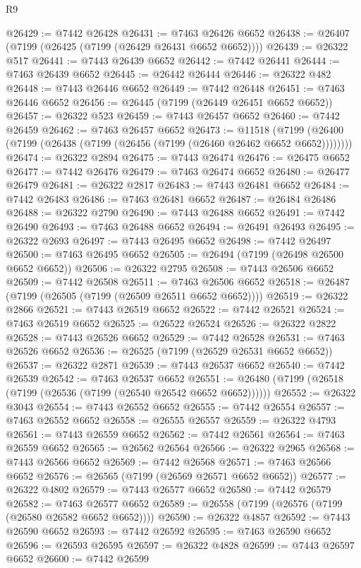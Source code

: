\begin{lexlean}{R9}
\begin{coremodule}
@26429 := @7442 @26428
@26431 := @7463 @26426 @6652
@26438 := @26407 (@7199 (@26425 (@7199 (@26429 @26431 @6652 @6652))))
@26439 := @26322 @517
@26441 := @7443 @26439 @6652
@26442 := @7442 @26441
@26444 := @7463 @26439 @6652
@26445 := @26442 @26444
@26446 := @26322 @482
@26448 := @7443 @26446 @6652
@26449 := @7442 @26448
@26451 := @7463 @26446 @6652
@26456 := @26445 (@7199 (@26449 @26451 @6652 @6652))
@26457 := @26322 @523
@26459 := @7443 @26457 @6652
@26460 := @7442 @26459
@26462 := @7463 @26457 @6652
@26473 := @11518
    (@7199 (@26400 (@7199 (@26438 (@7199 (@26456 (@7199 (@26460 @26462 @6652 @6652))))))))
@26474 := @26322 @2894
@26475 := @7443 @26474
@26476 := @26475 @6652
@26477 := @7442 @26476
@26479 := @7463 @26474 @6652
@26480 := @26477 @26479
@26481 := @26322 @2817
@26483 := @7443 @26481 @6652
@26484 := @7442 @26483
@26486 := @7463 @26481 @6652
@26487 := @26484 @26486
@26488 := @26322 @2790
@26490 := @7443 @26488 @6652
@26491 := @7442 @26490
@26493 := @7463 @26488 @6652
@26494 := @26491 @26493
@26495 := @26322 @2693
@26497 := @7443 @26495 @6652
@26498 := @7442 @26497
@26500 := @7463 @26495 @6652
@26505 := @26494 (@7199 (@26498 @26500 @6652 @6652))
@26506 := @26322 @2795
@26508 := @7443 @26506 @6652
@26509 := @7442 @26508
@26511 := @7463 @26506 @6652
@26518 := @26487 (@7199 (@26505 (@7199 (@26509 @26511 @6652 @6652))))
@26519 := @26322 @2866
@26521 := @7443 @26519 @6652
@26522 := @7442 @26521
@26524 := @7463 @26519 @6652
@26525 := @26522 @26524
@26526 := @26322 @2822
@26528 := @7443 @26526 @6652
@26529 := @7442 @26528
@26531 := @7463 @26526 @6652
@26536 := @26525 (@7199 (@26529 @26531 @6652 @6652))
@26537 := @26322 @2871
@26539 := @7443 @26537 @6652
@26540 := @7442 @26539
@26542 := @7463 @26537 @6652
@26551 := @26480 (@7199 (@26518 (@7199 (@26536 (@7199 (@26540 @26542 @6652 @6652))))))
@26552 := @26322 @3043
@26554 := @7443 @26552 @6652
@26555 := @7442 @26554
@26557 := @7463 @26552 @6652
@26558 := @26555 @26557
@26559 := @26322 @4793
@26561 := @7443 @26559 @6652
@26562 := @7442 @26561
@26564 := @7463 @26559 @6652
@26565 := @26562 @26564
@26566 := @26322 @2965
@26568 := @7443 @26566 @6652
@26569 := @7442 @26568
@26571 := @7463 @26566 @6652
@26576 := @26565 (@7199 (@26569 @26571 @6652 @6652))
@26577 := @26322 @4802
@26579 := @7443 @26577 @6652
@26580 := @7442 @26579
@26582 := @7463 @26577 @6652
@26589 := @26558 (@7199 (@26576 (@7199 (@26580 @26582 @6652 @6652))))
@26590 := @26322 @4857
@26592 := @7443 @26590 @6652
@26593 := @7442 @26592
@26595 := @7463 @26590 @6652
@26596 := @26593 @26595
@26597 := @26322 @4828
@26599 := @7443 @26597 @6652
@26600 := @7442 @26599

\end{coremodule}
\end{lexlean}
